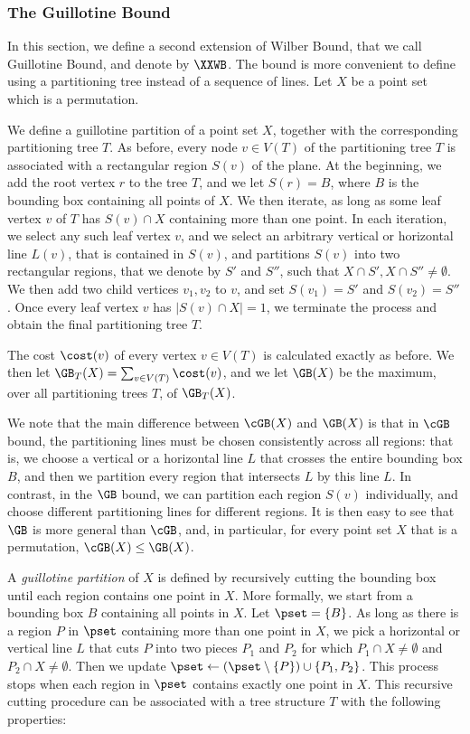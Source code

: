 \subsubsection{The Guillotine Bound}

In this section, we define a second extension of Wilber Bound, that we call Guillotine Bound, and denote by $\XXWB$. The bound is more convenient to define using a partitioning tree instead of a sequence of lines. 
Let $X$ be a point set which is a permutation.  

We define a guillotine partition of a point set $X$, together with the corresponding partitioning tree $T$. 
As before, every node $v\in V(T)$ of the partitioning tree $T$ is associated with a rectangular region $S(v)$ of the plane. At the beginning, we add the root vertex $r$ to the tree $T$, and we let $S(r)=B$, where $B$ is the bounding box containing all points of $X$. We then iterate, as long as some leaf vertex $v$ of $T$ has $S(v)\cap X$ containing more than one point. In each iteration, we select any such leaf vertex $v$, and we select an arbitrary vertical or horizontal line $L(v)$, that is contained in $S(v)$, and partitions $S(v)$ into two rectangular regions, that we denote by $S'$ and $S''$, such that $X\cap S',X\cap S''\neq \emptyset$. We then add two child vertices $v_1,v_2$ to $v$, and set $S(v_1)=S'$ and $S(v_2)=S''$. Once every leaf vertex $v$ has $|S(v)\cap X|=1$, we terminate the process and obtain the final partitioning tree $T$.

The cost $\cost(v)$ of every vertex $v\in V(T)$ is calculated exactly as before. We then let $\GB_T(X)=\sum_{v\in V(T)}\cost(v)$, and we let $\GB(X)$ be the maximum, over all partitioning trees $T$, of $\GB_T(X)$. 

We note that the main difference between $\cGB(X)$ and $\GB(X)$ is that in $\cGB$ bound, the partitioning lines must be chosen consistently across all regions: that is, we choose a vertical or a horizontal line $L$ that crosses the entire bounding box $B$, and then we partition every region that intersects $L$ by this line $L$. In contrast, in the $\GB$ bound, we can partition each region $S(v)$ individually, and choose different partitioning lines for different regions. It is then easy to see that $\GB$ is more general than $\cGB$, and, in particular, for every point set $X$ that is a permutation, $\cGB(X)\leq \GB(X)$.

\iffalse

A \emph{guillotine partition} of $X$ is defined by recursively cutting the bounding box until each region contains one point in $X$. 
More formally, we start from a bounding box $B$ containing all points in $X$. 
Let $\pset = \{B\}$. 
As long as there is a region $P$ in $\pset$ containing more than one point in $X$, we pick a horizontal or vertical line $L$ that cuts $P$ into two pieces $P_1$ and $P_2$ for which $P_1 \cap X \neq \emptyset$ and $P_2 \cap X \neq \emptyset$.
Then we update $\pset \leftarrow (\pset \setminus \{P\}) \cup \{P_1, P_2 \}$.   
This process stops when each region in $\pset$ contains exactly one point in $X$. 
This recursive cutting procedure can be associated with a tree structure $T$ with the following properties: 


